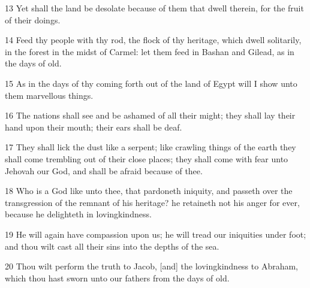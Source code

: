 \par 13 Yet shall the land be desolate because of them that dwell therein, for the fruit of their doings.
\par 14 Feed thy people with thy rod, the flock of thy heritage, which dwell solitarily, in the forest in the midst of Carmel: let them feed in Bashan and Gilead, as in the days of old.
\par 15 As in the days of thy coming forth out of the land of Egypt will I show unto them marvellous things.
\par 16 The nations shall see and be ashamed of all their might; they shall lay their hand upon their mouth; their ears shall be deaf.
\par 17 They shall lick the dust like a serpent; like crawling things of the earth they shall come trembling out of their close places; they shall come with fear unto Jehovah our God, and shall be afraid because of thee.
\par 18 Who is a God like unto thee, that pardoneth iniquity, and passeth over the transgression of the remnant of his heritage? he retaineth not his anger for ever, because he delighteth in lovingkindness.
\par 19 He will again have compassion upon us; he will tread our iniquities under foot; and thou wilt cast all their sins into the depths of the sea.
\par 20 Thou wilt perform the truth to Jacob, [and] the lovingkindness to Abraham, which thou hast sworn unto our fathers from the days of old.

